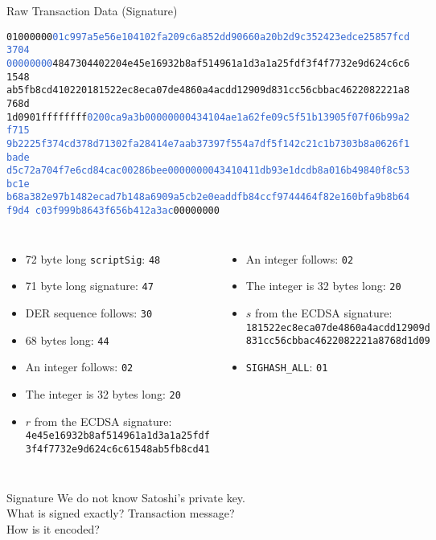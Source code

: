 \documentclass[]{beamer}
\begin{document}
\begin{frame}{Raw Transaction Data (Signature)}
	\begin{scriptsize}
\texttt{01000000\textcolor{highlight}{01c997a5e56e104102fa209c6a852dd90660a20b2d9c352423edce25857fcd3704
00000000}\textcolor{focus}{4847304402204e45e16932b8af514961a1d3a1a25fdf3f4f7732e9d624c6c61548
ab5fb8cd410220181522ec8eca07de4860a4acdd12909d831cc56cbbac4622082221a8768d
1d0901}ffffffff\textcolor{highlight}{0200ca9a3b00000000434104ae1a62fe09c5f51b13905f07f06b99a2f715
9b2225f374cd378d71302fa28414e7aab37397f554a7df5f142c21c1b7303b8a0626f1bade
d5c72a704f7e6cd84cac00286bee0000000043410411db93e1dcdb8a016b49840f8c53bc1e
b68a382e97b1482ecad7b148a6909a5cb2e0eaddfb84ccf9744464f82e160bfa9b8b64f9d4
c03f999b8643f656b412a3ac}00000000}
\end{scriptsize}
\scriptsize
\vspace{1em}
\begin{columns}
\begin{itemize}
	\item 72 byte long \texttt{scriptSig}: \texttt{48}
	\item 71 byte long signature: \texttt{47}
	\item DER sequence follows: \texttt{30}
	\item 68 bytes long: \texttt{44}
	\item An integer follows: \texttt{02}
	\item The integer is 32 bytes long: \texttt{20}
	\item $r$ from the ECDSA signature: 	\texttt{4e45e16932b8af514961a1d3a1a25fdf\\3f4f7732e9d624c6c61548ab5fb8cd41}
\end{itemize}
\begin{itemize}
	\item An integer follows: \texttt{02}
	\item The integer is 32 bytes long: \texttt{20}
	\item $s$ from the ECDSA signature: \texttt{181522ec8eca07de4860a4acdd12909d\\831cc56cbbac4622082221a8768d1d09}
	\item \texttt{SIGHASH\_ALL}: \texttt{01}
\end{itemize}
\end{columns}
\end{frame}

\begin{frame}{Signature}
	We do not know Satoshi's private key.\\
	What is signed exactly? Transaction message?	\\
	How is it encoded?
\end{frame}
\end{document}

